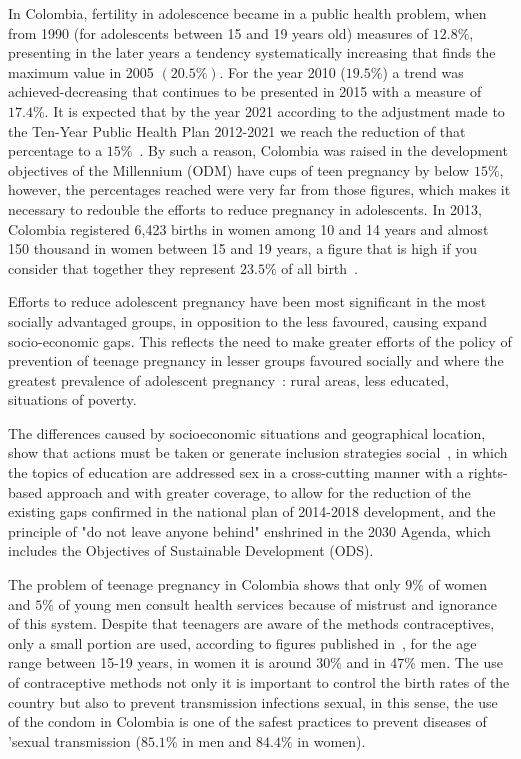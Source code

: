 \documentclass[journal,transmag]{IEEEtran}
\begin{document}
In Colombia, fertility in adolescence became in a public health problem, when from 1990 (for adolescents between 15 and 19 years old) measures of $12.8\%$, presenting in the later years a tendency systematically increasing that finds the maximum value in 2005 $(20.5\%)$. For the year 2010 ($19.5\%$) a trend was achieved-decreasing that continues to be presented in 2015 with a measure of $17.4\%$. It is expected that by the year 2021 according to the adjustment made to the Ten-Year Public Health Plan 2012-2021 we reach the reduction of that percentage to a $15\%$~\cite{Pro2015}. By such a reason, Colombia was raised in the development objectives of the Millennium (ODM) have cups of teen pregnancy by below $15\%$, however, the percentages reached were very far from those figures, which makes it necessary to redouble the efforts to reduce pregnancy in adolescents. In 2013, Colombia registered 6,423 births in women among 10 and 14 years and almost 150 thousand in women between 15 and 19 years, a figure that is high if you consider that together they represent $23.5\%$ of all birth~\cite{PNUD2015}.

Efforts to reduce adolescent pregnancy have been most significant in the most socially advantaged groups, in opposition to the less favoured, causing expand socio-economic gaps. This reflects the need to make greater efforts of the policy of prevention of teenage pregnancy in lesser groups favoured socially and where the greatest prevalence of adolescent pregnancy~\cite{Pro2015, Pro2015II}: rural areas, less educated, situations of poverty.

The differences caused by socioeconomic situations and geographical location, show that actions must be taken or generate inclusion strategies social~\cite{BID2017}, in which the topics of education are addressed sex in a cross-cutting manner with a rights-based approach and with greater coverage, to allow for the reduction of the existing gaps confirmed in the national plan of 2014-2018 development, and the principle of "do not leave anyone behind" enshrined in the 2030 Agenda, which includes the Objectives of Sustainable Development (ODS).

The problem of teenage pregnancy in Colombia shows that only $9\%$ of women and $5\%$ of young men consult health services because of mistrust and ignorance of this system. Despite that teenagers are aware of the methods contraceptives, only a small portion are used, according to figures published in~\cite{Pro2015II}, for the age range between 15-19 years, in women it is around $30\%$ and in $47\%$ men. The use of contraceptive methods not only it is important to control the birth rates of the country but also to prevent transmission infections sexual, in this sense, the use of the condom in Colombia is one of the safest practices to prevent diseases of 'sexual transmission ($85.1\%$ in men and $84.4\%$ in women).
 
\end{document}
